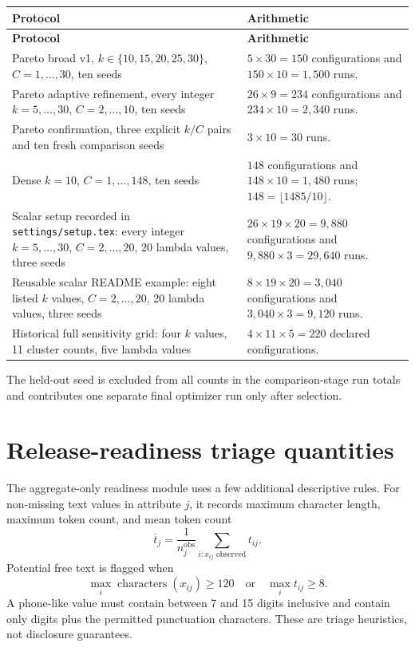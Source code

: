 \documentclass[11pt,a4paper]{article}
\newcommand{\code}[1]{\texttt{#1}}
\begin{document}
\begin{longtable}{@{}L{0.39\textwidth}L{0.55\textwidth}@{}}
\toprule
\textbf{Protocol} & \textbf{Arithmetic}\\
\midrule
\endfirsthead
\toprule
\textbf{Protocol} & \textbf{Arithmetic}\\
\midrule
\endhead
Pareto broad v1, $k\in\{10,15,20,25,30\}$, $C=1,\ldots,30$, ten seeds
& $5\times30=150$ configurations and $150\times10=1{,}500$ runs.\\
Pareto adaptive refinement, every integer $k=5,\ldots,30$, $C=2,\ldots,10$, ten seeds
& $26\times9=234$ configurations and $234\times10=2{,}340$ runs.\\
Pareto confirmation, three explicit $k/C$ pairs and ten fresh comparison seeds
& $3\times10=30$ runs.\\
Dense $k=10$, $C=1,\ldots,148$, ten seeds
& $148$ configurations and $148\times10=1{,}480$ runs; $148=\lfloor1485/10\rfloor$.\\
Scalar setup recorded in \code{settings/setup.tex}: every integer $k=5,\ldots,30$, $C=2,\ldots,20$, 20 lambda values, three seeds
& $26\times19\times20=9{,}880$ configurations and $9{,}880\times3=29{,}640$ runs.\\
Reusable scalar README example: eight listed $k$ values, $C=2,\ldots,20$, 20 lambda values, three seeds
& $8\times19\times20=3{,}040$ configurations and $3{,}040\times3=9{,}120$ runs.\\
Historical full sensitivity grid: four $k$ values, 11 cluster counts, five lambda values
& $4\times11\times5=220$ declared configurations.\\
\bottomrule
\end{longtable}

The held-out seed is excluded from all counts in the comparison-stage run
totals and contributes one separate final optimizer run only after selection.

\section{Release-readiness triage quantities}

The aggregate-only readiness module uses a few additional descriptive rules.
For non-missing text values in attribute $j$, it records maximum character
length, maximum token count, and mean token count
\begin{equation}
\overline t_j=\frac1{n_j^{\mathrm{obs}}}
\sum_{i:x_{ij}\text{ observed}}t_{ij}.
\tag{112}
\end{equation}
Potential free text is flagged when
\begin{equation}
\max_i\operatorname{characters}(x_{ij})\ge120
\quad\text{or}\quad
\max_i t_{ij}\ge8.
\tag{113}
\end{equation}
A phone-like value must contain between 7 and 15 digits inclusive and contain
only digits plus the permitted punctuation characters.  These are triage
heuristics, not disclosure guarantees.
\end{document}
